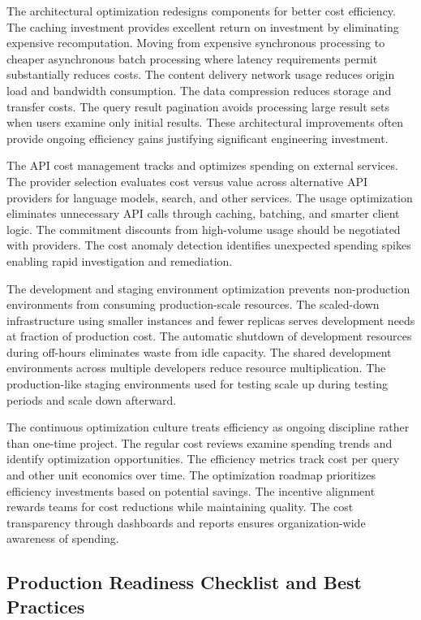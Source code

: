 The architectural optimization redesigns components for better cost efficiency. The caching investment provides excellent return on investment by eliminating expensive recomputation. Moving from expensive synchronous processing to cheaper asynchronous batch processing where latency requirements permit substantially reduces costs. The content delivery network usage reduces origin load and bandwidth consumption. The data compression reduces storage and transfer costs. The query result pagination avoids processing large result sets when users examine only initial results. These architectural improvements often provide ongoing efficiency gains justifying significant engineering investment.

The API cost management tracks and optimizes spending on external services. The provider selection evaluates cost versus value across alternative API providers for language models, search, and other services. The usage optimization eliminates unnecessary API calls through caching, batching, and smarter client logic. The commitment discounts from high-volume usage should be negotiated with providers. The cost anomaly detection identifies unexpected spending spikes enabling rapid investigation and remediation.

The development and staging environment optimization prevents non-production environments from consuming production-scale resources. The scaled-down infrastructure using smaller instances and fewer replicas serves development needs at fraction of production cost. The automatic shutdown of development resources during off-hours eliminates waste from idle capacity. The shared development environments across multiple developers reduce resource multiplication. The production-like staging environments used for testing scale up during testing periods and scale down afterward.

The continuous optimization culture treats efficiency as ongoing discipline rather than one-time project. The regular cost reviews examine spending trends and identify optimization opportunities. The efficiency metrics track cost per query and other unit economics over time. The optimization roadmap prioritizes efficiency investments based on potential savings. The incentive alignment rewards teams for cost reductions while maintaining quality. The cost transparency through dashboards and reports ensures organization-wide awareness of spending.

\subsection{Production Readiness Checklist and Best Practices}

